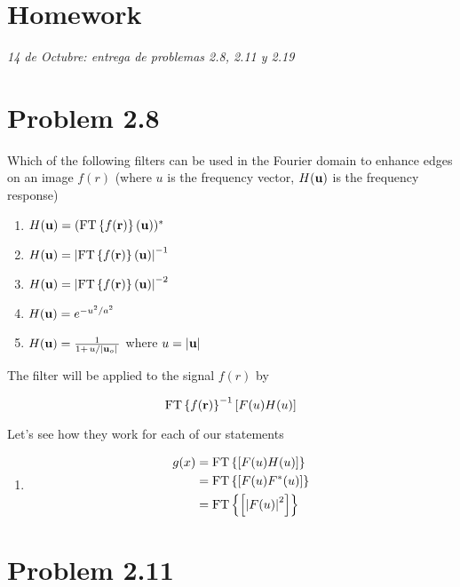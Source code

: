 \documentclass[../main/main.tex]{subfiles}
\begin{document}
\section{Homework}

\emph{14 de Octubre: entrega de problemas 2.8, 2.11 y 2.19}

\section*{Problem 2.8}


Which of the following filters can be used in the Fourier domain to enhance edges on an image $f(r)$ (where $u$ is the frequency vector, $H(\vb{u})$ is the frequency response)

\begin{enumerate}
	\item $H(\vb{u}) = (\textrm{FT}\left\{f(\vb{r})\right\}(\vb{u}))^{*}$
	\item $H(\vb{u}) = \abs{\textrm{FT}\left\{f(\vb{r})\right\}(\vb{u})}^{-1}$
	\item $H(\vb{u}) = \abs{\textrm{FT}\left\{f(\vb{r})\right\}(\vb{u})}^{-2}$
	\item $H(\vb{u}) = e^{-u^{2}/a^{2}}$
	\item $H(\u) = \frac{1}{1+\flatfrac {u}{|\u_{o}|}}$ where $u = \abs{\vb{u}}$
\end{enumerate}





The filter will be applied to the signal $f(r)$ by

\begin{equation*}
\textrm{FT}\left\{f(\vb{r})\right\}^{-1}\left[F(u)H(u)\right]
\end{equation*}

Let's see how they work for each of our statements


\begin{enumerate}
	\item
	\begin{align*}
	g(x)
	&=  \textrm{FT}\left\{\left[F(u)H(u)\right]\right\}\\
	&=  \textrm{FT}\left\{\left[F(u)F^{*}(u)\right]\right\}\\
	&=  \textrm{FT}\left\{\left[\abs{F(u)}^{2}\right]\right\}\\
	\end{align*}

\end{enumerate}

\section*{Problem 2.11}
\end{document}
